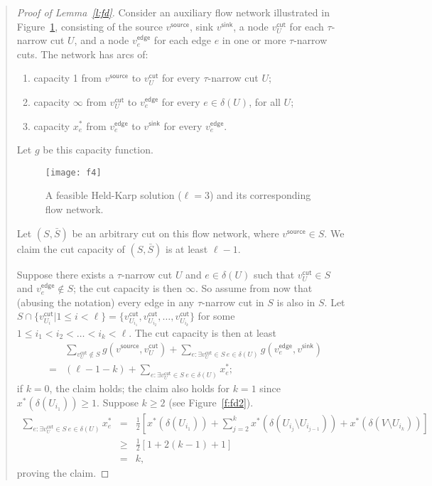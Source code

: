 \documentclass[11pt,letterpaper]{article}
\begin{document}
\begin{quote}
\begin{proof}[Proof of Lemma~\ref{l:fd}]
Consider an auxiliary flow network illustrated in Figure~\ref{f:fd}, consisting of the source $v^{\mathsf{source}}$, sink $v^{\mathsf{sink}}$, a node $v^{\mathsf{cut}}_U$ for each $\tau$-narrow cut $U$, and a node $v^{\mathsf{edge}}_e$ for each edge $e$ in one or more $\tau$-narrow cuts. The network has arcs of:\begin{enumerate}
\item capacity 1 from $v^{\mathsf{source}}$ to $v^{\mathsf{cut}}_U$ for every $\tau$-narrow cut $U$;
\item capacity $\infty$ from $v^{\mathsf{cut}}_U$ to $v^{\mathsf{edge}}_e$ for every $e\in\delta(U)$, for all $U$;
\item capacity $x^*_e$ from $v^{\mathsf{edge}}_e$ to $v^{\mathsf{sink}}$ for every $v^{\mathsf{edge}}_e$.
\end{enumerate} Let $g$ be this capacity function.

\begin{figure}
\center
\texttt{[image: f4]}
\caption{A feasible Held-Karp solution ($\ell=3$) and its corresponding flow network.}
\label{f:fd}
\end{figure}

Let $(S,\bar S)$ be an arbitrary cut on this flow network, where $v^{\mathsf{source}}\in S$. We claim the cut capacity of $(S,\bar S)$ is at least $\ell-1$.

Suppose there exists a $\tau$-narrow cut $U$ and $e\in\delta(U)$ such that $v^{\mathsf{cut}}_U\in S$ and $v^{\mathsf{edge}}_e\notin S$; the cut capacity is then $\infty$. So assume from now that (abusing the notation) every edge in any $\tau$-narrow cut in $S$ is also in $S$. Let $S\cap\{v^{\mathsf{cut}}_{U_i}|1\leq i<\ell\}=\{v^{\mathsf{cut}}_{U_{i_1}}, v^{\mathsf{cut}}_{U_{i_2}}, \ldots, v^{\mathsf{cut}}_{U_{i_k}}\}$ for some $1\leq i_1 < i_2 < \ldots < i_k < \ell$. The cut capacity is then at least\begin{eqnarray*}
&&\sum_{v^{\mathsf{cut}}_U\notin S}g(v^{\mathsf{source}},v^{\mathsf{cut}}_U)+
\sum_{e:\exists v^{\mathsf{cut}}_U\in S\ e\in\delta(U)}g(v^{\mathsf{edge}}_e,v^{\mathsf{sink}})\\
&=& (\ell-1-k) + \sum_{e:\exists v^{\mathsf{cut}}_U\in S\ e\in\delta(U)} x_e^*
;\end{eqnarray*}if $k=0$, the claim holds; the claim also holds for $k=1$ since $x^*(\delta(U_{i_1}))\geq 1$. Suppose $k\geq 2$ (see Figure~\ref{f:fd2}).\begin{eqnarray*}
\sum_{e:\exists v^{\mathsf{cut}}_U\in S\ e\in\delta(U)} x_e^*
&=&\frac{1}{2}\left[x^*(\delta(U_{i_1}))+\sum_{j=2}^k x^*(\delta(U_{i_j}\setminus U_{i_{j-1}}))+x^*(\delta(V\setminus U_{i_k}))\right]\\
&\geq& \frac{1}{2}\left[1+2(k-1)+1\right]\\
&=& k
,\end{eqnarray*}proving the claim.


\end{proof}
\end{quote}
\end{document}
